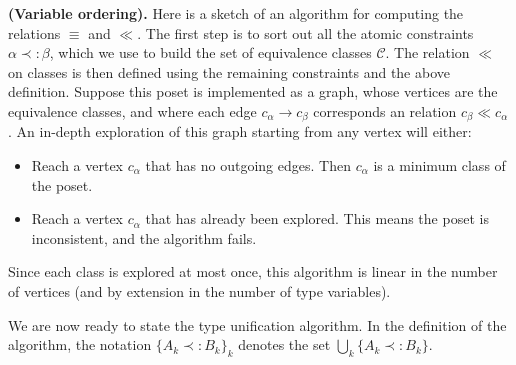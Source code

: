 \begin{algorithm}{\bf (Variable ordering).}
  Here is a sketch of an algorithm for computing the relations $\equiv$ and $\ll$. 
  The first step is to sort out all the atomic constraints $\alpha \prec: \beta$, which we use to build the set of equivalence classes
  $\mathcal{C}$. The relation $\ll$ on classes is then defined using the remaining constraints and the above definition.
  Suppose this poset is implemented as a graph, whose vertices are the equivalence classes, and where each edge
  $c_\alpha \rightarrow c_\beta$ corresponds an relation $c_\beta \ll c_\alpha$. An in-depth exploration of this graph starting from any
  vertex will either:
  	\begin{itemize}
  		\item Reach a vertex $c_\alpha$ that has no outgoing edges. Then $c_\alpha$ is a minimum class of the poset.
  		\item Reach a vertex $c_\alpha$ that has already been explored. This means the poset is inconsistent, and the algorithm fails.
  	\end{itemize}
  Since each class is explored at most once, this algorithm is linear in the number of vertices (and by extension in the number of type
  variables).
\end{algorithm}

We are now ready to state the type unification algorithm. 
In the definition of the algorithm, the notation $\{ A_k \prec: B_k \}_k$ denotes the set $\bigcup_{k} \{ A_k \prec: B_k \}$.


